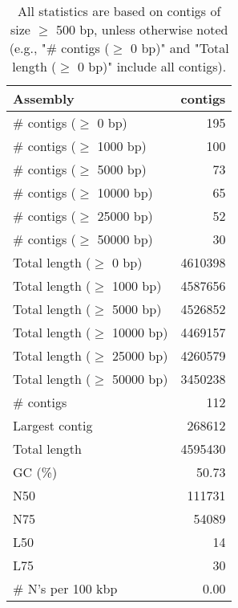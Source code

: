 \documentclass[12pt,a4paper]{article}
\begin{document}
\begin{table}[ht]
\begin{center}
\caption{All statistics are based on contigs of size $\geq$ 500 bp, unless otherwise noted (e.g., "\# contigs ($\geq$ 0 bp)" and "Total length ($\geq$ 0 bp)" include all contigs).}
\begin{tabular}{|l*{1}{|r}|}
\hline
Assembly & contigs \\ \hline
\# contigs ($\geq$ 0 bp) & 195 \\ \hline
\# contigs ($\geq$ 1000 bp) & 100 \\ \hline
\# contigs ($\geq$ 5000 bp) & 73 \\ \hline
\# contigs ($\geq$ 10000 bp) & 65 \\ \hline
\# contigs ($\geq$ 25000 bp) & 52 \\ \hline
\# contigs ($\geq$ 50000 bp) & 30 \\ \hline
Total length ($\geq$ 0 bp) & 4610398 \\ \hline
Total length ($\geq$ 1000 bp) & 4587656 \\ \hline
Total length ($\geq$ 5000 bp) & 4526852 \\ \hline
Total length ($\geq$ 10000 bp) & 4469157 \\ \hline
Total length ($\geq$ 25000 bp) & 4260579 \\ \hline
Total length ($\geq$ 50000 bp) & 3450238 \\ \hline
\# contigs & 112 \\ \hline
Largest contig & 268612 \\ \hline
Total length & 4595430 \\ \hline
GC (\%) & 50.73 \\ \hline
N50 & 111731 \\ \hline
N75 & 54089 \\ \hline
L50 & 14 \\ \hline
L75 & 30 \\ \hline
\# N's per 100 kbp & 0.00 \\ \hline
\end{tabular}
\end{center}
\end{table}
\end{document}
